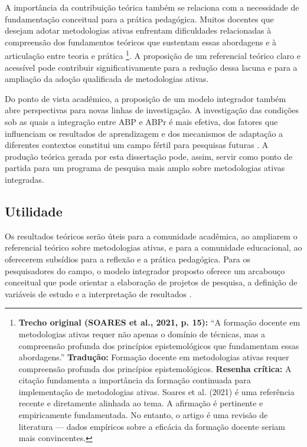 A importância da contribuição teórica também se relaciona com a necessidade de fundamentação conceitual para a prática pedagógica. Muitos docentes que desejam adotar metodologias ativas enfrentam dificuldades relacionadas à compreensão dos fundamentos teóricos que sustentam essas abordagens e à articulação entre teoria e prática \cite{SOARES2021}\footnote{\textbf{Trecho original (SOARES et al., 2021, p. 15):} ``A formação docente em metodologias ativas requer não apenas o domínio de técnicas, mas a compreensão profunda dos princípios epistemológicos que fundamentam essas abordagens.'' \textbf{Tradução:} Formação docente em metodologias ativas requer compreensão profunda dos princípios epistemológicos. \textbf{Resenha crítica:} A citação fundamenta a importância da formação continuada para implementação de metodologias ativas. Soares et al. (2021) é uma referência recente e diretamente alinhada ao tema. A afirmação é pertinente e empiricamente fundamentada. No entanto, o artigo é uma revisão de literatura — dados empíricos sobre a eficácia da formação docente seriam mais convincentes.}. A proposição de um referencial teórico claro e acessível pode contribuir significativamente para a redução dessa lacuna e para a ampliação da adoção qualificada de metodologias ativas.

Do ponto de vista acadêmico, a proposição de um modelo integrador também abre perspectivas para novas linhas de investigação. A investigação das condições sob as quais a integração entre ABP e ABPr é mais efetiva, dos fatores que influenciam os resultados de aprendizagem e dos mecanismos de adaptação a diferentes contextos constitui um campo fértil para pesquisas futuras \cite{SANTOS2024}. A produção teórica gerada por esta dissertação pode, assim, servir como ponto de partida para um programa de pesquisa mais amplo sobre metodologias ativas integradas.

\subsection{Utilidade}
\label{subsec:jt_utilidade}

Os resultados teóricos serão úteis para a comunidade acadêmica, ao ampliarem o referencial teórico sobre metodologias ativas, e para a comunidade educacional, ao oferecerem subsídios para a reflexão e a prática pedagógica. Para os pesquisadores do campo, o modelo integrador proposto oferece um arcabouço conceitual que pode orientar a elaboração de projetos de pesquisa, a definição de variáveis de estudo e a interpretação de resultados \cite{CRESWELL2018}.

